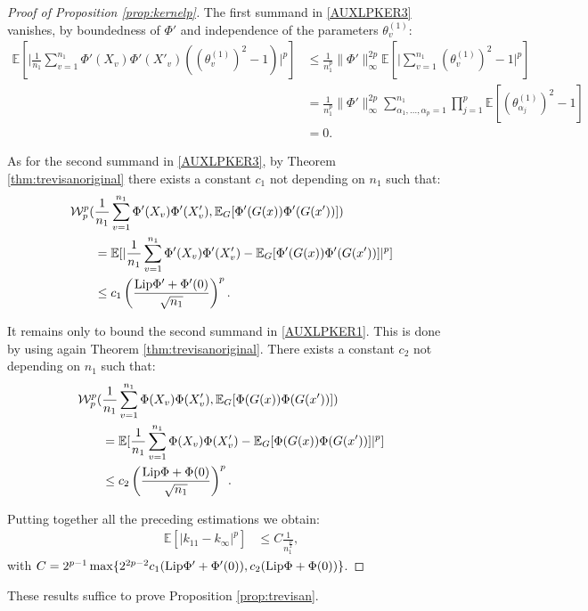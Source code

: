\documentclass{article}
\theoremstyle{definition}
\theoremstyle{remark}
\numberwithin{equation}{section}
\newcommand{\E}{\mathbb{E}}
\newcommand{\norm}[2]{
    \|#1\|_{#2}
}
\begin{document}
\begin{proof}[Proof of Proposition \ref{prop:kernelp}]
    The first summand in \eqref{AUXLPKER3} vanishes, by boundedness of $\Phi'$ and independence of the parameters $\theta^{(1)}_v$:
    \begin{align}
        \E[\vert \frac{1}{n_1}\sum_{v=1}^{n_1}\Phi'(X_v)\Phi'(X'_v)((\theta^{(1)}_v)^2-1)\vert^p] &\le \frac{1}{n_1^p}\norm{\Phi'}{\infty}^{2p}\E[\vert \sum_{v=1}^{n_1}(\theta^{(1)}_v)^2-1 \vert^p]\\
        &= \frac{1}{n_1^p}\norm{\Phi'}{\infty}^{2p}\sum_{\alpha_1,\ldots, \alpha_p = 1}^{n_1}\prod_{j=1}^p\E[(\theta^{(1)}_{\alpha_j})^2-1]\\
        &= 0.
    \end{align}

    As for the second summand in \eqref{AUXLPKER3}, by Theorem \ref{thm:trevisanoriginal} there exists a constant $c_1$ not depending on $n_1$ such that:
    \begin{align}
        \mathcal W^p_p(&\frac{1}{n_1}\sum_{v=1}^{n_1}\Phi'(X_v)\Phi'(X'_v),\E_G[\Phi'(G(x))\Phi'(G(x'))])\\
        &=\E[\vert\frac{1}{n_1}\sum_{v=1}^{n_1}\Phi'(X_v)\Phi'(X'_v) - \E_G[\Phi'(G(x))\Phi'(G(x'))]\vert^p]\\
        &\le c_1 \left(\frac{\textup{Lip}\Phi' + \Phi'(0)}{\sqrt{n_1}}\right)^p.
    \end{align}

    It remains only to bound the second summand in \eqref{AUXLPKER1}.
    This is done by using again Theorem \ref{thm:trevisanoriginal}.
    There exists a constant $c_2$ not depending on $n_1$ such that:
    \begin{align}
        \mathcal W^p_p(&\frac{1}{n_1}\sum_{v=1}^{n_1}\Phi(X_v)\Phi(X'_v),\E_G[\Phi(G(x))\Phi(G(x'))])\\
        &=\E[\frac{1}{n_1}\sum_{v=1}^{n_1}\Phi(X_v)\Phi(X'_v)- \E_G[\Phi(G(x))\Phi(G(x'))]\vert^p]\\
        &\le c_2  \left(\frac{\textup{Lip}\Phi + \Phi(0)}{\sqrt{n_1}}\right)^p.
    \end{align}

    Putting together all the preceding estimations we obtain: 
    \begin{align}
        \E[\vert k_{11}-k_\infty\vert^p] &\le C \frac{1}{n_1^\frac{p}{2}},
    \end{align}
    with $C = 2^{p-1}\max\{2^{2p-2}c_1(\textup{Lip}\Phi' + \Phi'(0)), c_2(\textup{Lip}\Phi + \Phi(0))\}$.
\end{proof}

These results suffice to prove Proposition \ref{prop:trevisan}.
\end{document}
